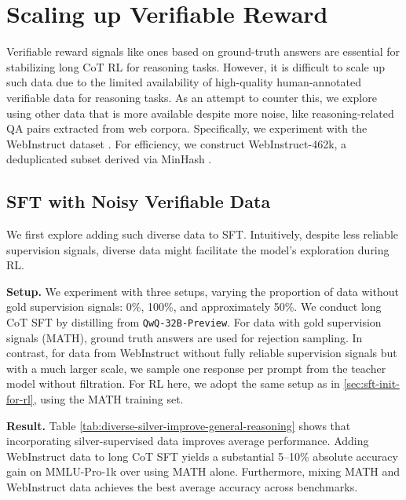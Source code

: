 \section{Scaling up Verifiable Reward}\label{sec:silver-data}

Verifiable reward signals like ones based on ground-truth answers are essential for stabilizing long CoT RL for reasoning tasks. However, it is difficult to scale up such data due to the limited availability of high-quality human-annotated verifiable data for reasoning tasks. As an attempt to counter this, we explore using other data that is more available despite more noise, like reasoning-related QA pairs extracted from web corpora. Specifically, we experiment with the WebInstruct dataset \citep{yue2024mammoth2}. For efficiency, we construct WebInstruct-462k, a deduplicated subset derived via MinHash \citep{broder1998minhash}. 

\subsection{SFT with Noisy Verifiable Data}\label{sec:sft-with-noisy-verifiable-data}

We first explore adding such diverse data to SFT. Intuitively, despite less reliable supervision signals, diverse data might facilitate the model’s exploration during RL.

\noindent\textbf{Setup.} We experiment with three setups, varying the proportion of data without gold supervision signals: 0\%, 100\%, and approximately 50\%. We conduct long CoT SFT by distilling from \texttt{QwQ-32B-Preview}. For data with gold supervision signals (MATH), ground truth answers are used for rejection sampling. In contrast, for data from WebInstruct without fully reliable supervision signals but with a much larger scale, we sample one response per prompt from the teacher model without filtration. For RL here, we adopt the same setup as in \textsection\ref{sec:sft-init-for-rl}, using the MATH training set.

\noindent\textbf{Result.} Table \ref{tab:diverse-silver-improve-general-reasoning} shows that incorporating silver-supervised data improves average performance. Adding WebInstruct data to long CoT SFT yields a substantial 5–10\% absolute accuracy gain on MMLU-Pro-1k over using MATH alone. Furthermore, mixing MATH and WebInstruct data achieves the best average accuracy across benchmarks.

